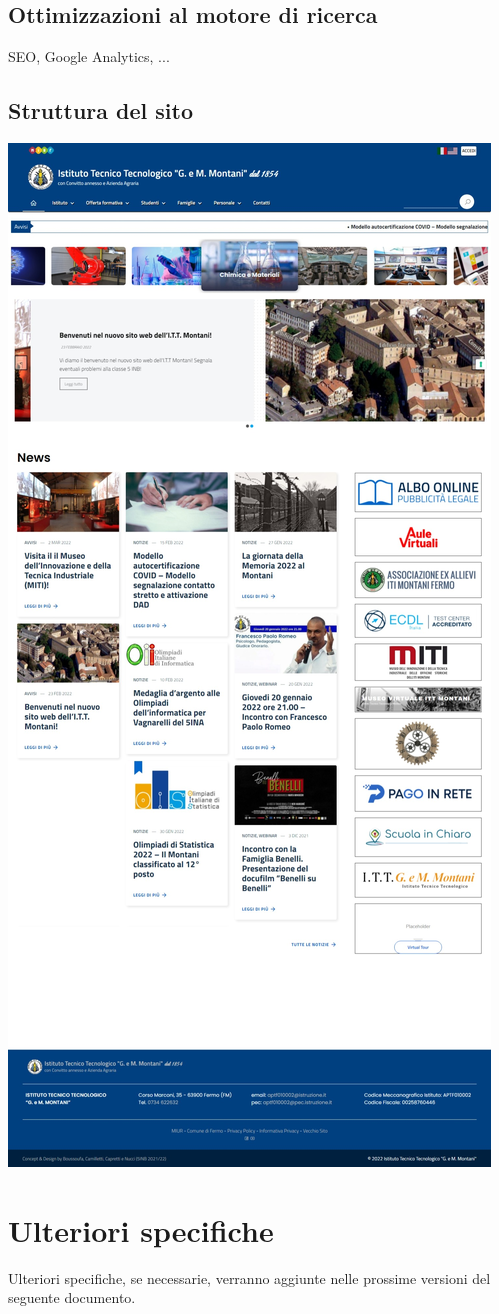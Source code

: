 \documentclass{article}
\begin{document}
	\subsection{\textbf{Ottimizzazioni al motore di ricerca}}
	SEO, Google Analytics, ...	
\clearpage

	\subsection{\textbf{Struttura del sito}}
	\includegraphics[scale=0.2]{struttura.jpeg}\\
\section{\textbf{Ulteriori specifiche}}
Ulteriori specifiche, se necessarie, verranno aggiunte nelle prossime versioni del seguente documento.
\end{document}
